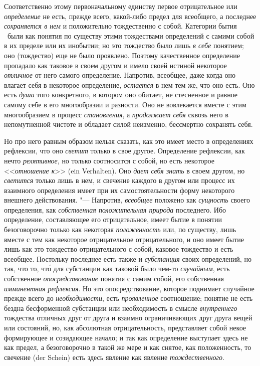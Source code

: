 {Соответственно этому первоначальному единству первое
отрицательное или {\em определение}
не есть, прежде всего, какой-либо предел для всеобщего, а
последнее {\em сохраняется в нем}
и положительно тождественно с собой. Категории бытия
\ были как понятия по существу этими тождествами определений
с самими собой в их пределе или их инобытии; но это тождество было лишь
{\em в себе} понятием;
оно (тождество) еще не было проявлено. Поэтому качественное определение
пропадало как таковое в своем другом и имело своей истиной некоторое
{\em отличное} от него
самого определение. Напротив, всеобщее, даже когда оно влагает себя в
некоторое определение, {\em остается}
в нем тем же, что оно есть. Оно есть
{\em душа} того
конкретного, в котором оно обитает, не стесненное и равное самому себе в
его многообразии и разности. Оно не вовлекается вместе с этим многообразием
в процесс {\em становления},
а {\em продолжает себя}
сквозь него в непомутненной чистоте и обладает силой
неизменно, бессмертно сохранять себя.

Но про него равным образом нельзя сказать, как это имеет место
в определениях рефлексии, что оно
{\em светит} только в
свое другое. Определение рефлексии, как нечто
{\em релятивное}, но
только соотносится с собой, но есть некоторое
<<{\em отношение к}>> (ein Verhalten).
Оно {\em дает себя знать}
в своем другом, но
{\em светится} только
лишь в нем, и свечение каждого в другом или процесс их взаимного
определения имеет при их самостоятельности форму некоторого внешнего
действования. "--- Напротив,
{\em всеобщее} положено
как {\em сущность} своего
определения, как {\em собственная
положительная природа} последнего. Ибо определение,
составляющее его отрицательное, имеет бытие в понятии безоговорочно только
как некоторая {\em положенность}
или, по существу, лишь вместе с тем как некоторое
отрицательное отрицательного, и оно имеет бытие лишь как это тождество
отрицательного с собой, каковое тождество и есть всеобщее. Постольку
последнее есть также и {\em субстанция}
своих определений, но так, что то, чт\'{о} для субстанции как
таковой было чем-то {\em случайным},
есть собственное
{\em опосредствование}
понятия с самим собой, его собственная
{\em имманентная рефлексия}.
Но это опосредствование, которое поднимает случайное прежде
всего до {\em необходимости},
есть {\em проявленное}
соотношение; понятие не есть бездна бесформенной субстанции
или необходимость в смысле
{\em внутреннего}
тождества отличных друг от друга и взаимно ограничивающих
друг друга вещей или
состояний,
но, как абсолютная отрицательность, представляет собой некое
формирующее и созидающее начало; и так как определение выступает здесь не
как предел, а безоговорочно в такой же мере и как снятое, как положенность,
то свечение (der Schein) есть здесь явление как явление
{\em тождественного}.

}
